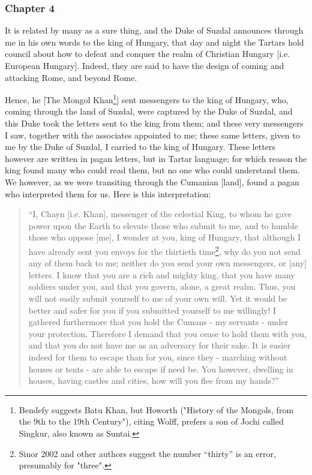 \subsubsection{Chapter 4}

It is related by many as a sure thing, and the Duke of Suzdal announces through me in his own words to the king of Hungary, that day and night the Tartars hold council about how to defeat and conquer the realm of Christian Hungary [i.e. European Hungary]. Indeed, they are said to have the design of coming and attacking Rome, and beyond Rome.

Hence, he [The Mongol Khan\footnote{Bendefy suggests Batu Khan, but Howorth ("History of the Mongols, from the 9th to the 19th Century"), citing Wolff, prefers a son of Jochi called Singkur, also known as Suntai.}] sent messengers to the king of Hungary, who, coming through the land of Suzdal, were captured by the Duke of Suzdal, and this Duke took the letters sent to the king from them; and these very messengers I saw, together with the associates appointed to me; these same letters, given to me by the Duke of Suzdal, I carried to the king of Hungary. These letters however are written in pagan letters, but in Tartar language; for which reason the king found many who could read them, but no one who could understand them. We however, as we were transiting through the Cumanian [land], found a pagan who interpreted them for us. Here is this interpretation: 

\begin{quote}
``I, Chayn [i.e. Khan], messenger of the celestial King, to whom he gave power upon the Earth to elevate those who submit to me, and to humble those who oppose [me], I wonder at you, king of Hungary, that although I have already sent you envoys for the thirtieth time\footnote{Sinor 2002 and other authors suggest the number ``thirty'' is an error, presumably for "three".}, why do you not send any of them back to me; neither do you send your own messengers, or [any] letters. I know that you are a rich and mighty king, that you have many soldiers under you, and that you govern, alone, a great realm. Thus, you will not easily submit yourself to me of your own will. Yet it would be better and safer for you if you submitted yourself to me willingly! I gathered furthermore that you hold the Cumans - my servants - under your protection, Therefore I demand that you cease to hold them with you, and that you do not have me as an adversary for their sake. It is easier indeed for them to escape than for you, since they - marching without houses or tents - are able to escape if need be. You however, dwelling in houses, having castles and cities, how will you flee from my hands?''
\end{quote}


